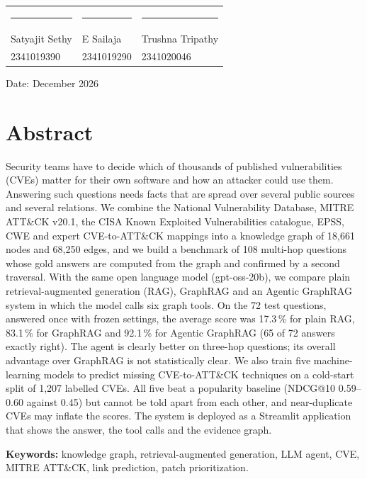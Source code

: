 \documentclass[12pt, a4paper]{article}
\begin{document}
\vspace{2.5cm}
\noindent\begin{tabular}{@{}p{5.2cm}p{5.2cm}p{5.2cm}@{}}
\rule{4.6cm}{0.4pt} & \rule{4.6cm}{0.4pt} & \rule{4.6cm}{0.4pt} \\
Satyajit Sethy & E Sailaja & Trushna Tripathy \\
2341019390 & 2341019290 & 2341020046 \\
\end{tabular}

\vspace{1cm}
\noindent Date: December 2026
\newpage
\fi
\section*{Abstract}
Security teams have to decide which of thousands of published vulnerabilities (CVEs) matter for their own software and how an attacker could use them. Answering such questions needs facts that are spread over several public sources and several relations. We combine the National Vulnerability Database, MITRE ATT\&CK v20.1, the CISA Known Exploited Vulnerabilities catalogue, EPSS, CWE and expert CVE-to-ATT\&CK mappings into a knowledge graph of 18,661 nodes and 68,250 edges, and we build a benchmark of 108 multi-hop questions whose gold answers are computed from the graph and confirmed by a second traversal. With the same open language model (gpt-oss-20b), we compare plain retrieval-augmented generation (RAG), GraphRAG and an Agentic GraphRAG system in which the model calls six graph tools. On the 72 test questions, answered once with frozen settings, the average score was 17.3\,\% for plain RAG, 83.1\,\% for GraphRAG and 92.1\,\% for Agentic GraphRAG (65 of 72 answers exactly right). The agent is clearly better on three-hop questions; its overall advantage over GraphRAG is not statistically clear. We also train five machine-learning models to predict missing CVE-to-ATT\&CK techniques on a cold-start split of 1,207 labelled CVEs. All five beat a popularity baseline (NDCG@10 0.59--0.60 against 0.45) but cannot be told apart from each other, and near-duplicate CVEs may inflate the scores. The system is deployed as a Streamlit application that shows the answer, the tool calls and the evidence graph.

\medskip\noindent\textbf{Keywords:} knowledge graph, retrieval-augmented generation, LLM agent, CVE, MITRE ATT\&CK, link prediction, patch prioritization.
\end{document}
